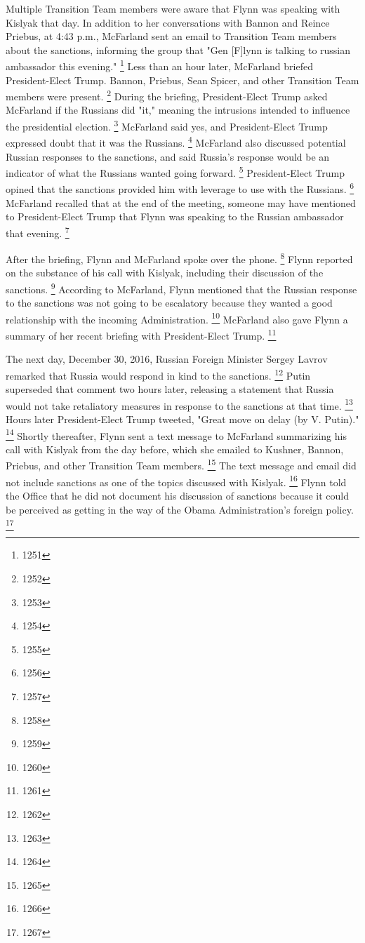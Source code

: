 Multiple Transition Team members were aware that Flynn was speaking with Kislyak that day.
In addition to her conversations with Bannon and Reince Priebus, at 4:43 p.m., McFarland sent an email to Transition Team members about the sanctions, informing the group that "Gen [F]lynn is talking to russian ambassador this evening."%
\footnote{1251}
Less than an hour later, McFarland briefed President-Elect Trump.
Bannon, Priebus, Sean Spicer, and other Transition Team members were present.%
\footnote{1252}
During the briefing, President-Elect Trump asked McFarland if the Russians did "it," meaning the intrusions intended to influence the presidential election.%
\footnote{1253}
McFarland said yes, and President-Elect Trump expressed doubt that it was the Russians.%
\footnote{1254}
McFarland also discussed potential Russian responses to the sanctions, and said Russia's response would be an indicator of what the Russians wanted going forward.%
\footnote{1255}
President-Elect Trump opined that the sanctions provided him with leverage to use with the Russians.%
\footnote{1256}
McFarland recalled that at the end of the meeting, someone may have mentioned to President-Elect Trump that Flynn was speaking to the Russian ambassador that evening.%
\footnote{1257}

After the briefing, Flynn and McFarland spoke over the phone.%
\footnote{1258}
Flynn reported on the substance of his call with Kislyak, including their discussion of the sanctions.%
\footnote{1259}
According to McFarland, Flynn mentioned that the Russian response to the sanctions was not going to be escalatory because they wanted a good relationship with the incoming Administration.%
\footnote{1260}
McFarland also gave Flynn a summary of her recent briefing with President-Elect Trump.%
\footnote{1261}

The next day, December 30, 2016, Russian Foreign Minister Sergey Lavrov remarked that Russia would respond in kind to the sanctions.%
\footnote{1262}
Putin superseded that comment two hours later, releasing a statement that Russia would not take retaliatory measures in response to the sanctions at that time.%
\footnote{1263}
Hours later President-Elect Trump tweeted, "Great move on delay (by V. Putin)."%
\footnote{1264}
Shortly thereafter, Flynn sent a text message to McFarland summarizing his call with Kislyak from the day before, which she emailed to Kushner, Bannon, Priebus, and other Transition Team members.%
\footnote{1265}
The text message and email did not include sanctions as one of the topics discussed with Kislyak.%
\footnote{1266}
Flynn told the Office that he did not document his discussion of sanctions because it could be perceived as getting in the way of the Obama Administration's foreign policy.%
\footnote{1267}

